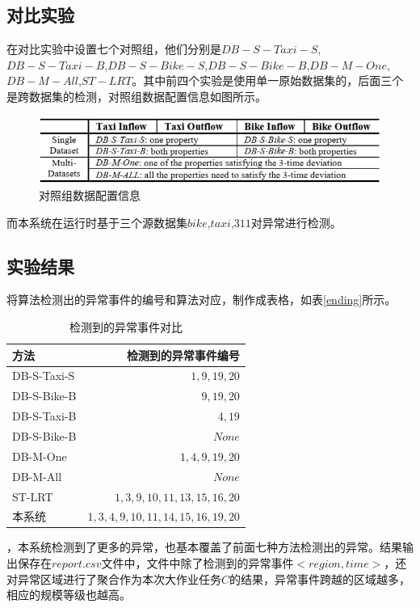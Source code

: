 \documentclass[a4paper, UTF8]{article}
\begin{document}
\begin{CJK}{UTF8}{gbsn}
\subsection{对比实验}
在对比实验中设置七个对照组，他们分别是$DB-S-Taxi-S$,$DB-S-Taxi-B$,$DB-S-Bike-S$,$DB-S-Bike-B$,$DB-M-One$,$DB-M-All$,$ST-LRT$。其中前四个实验是使用单一原始数据集的，后面三个是跨数据集的检测，对照组数据配置信息如图所示。
\begin{figure}[ht]
\includegraphics[scale = 0.6]{experiment.png}
\centering
\caption{对照组数据配置信息}
\end{figure}
\par 而本系统在运行时基于三个源数据集$bike$,$taxi$,$311$对异常进行检测。





\subsection{实验结果}
将算法检测出的异常事件的编号和算法对应，制作成表格，如表\ref{ending}所示。

\begin{table}[ht]
\centering
\caption{检测到的异常事件对比}
\label{ending}
\begin{tabular}{l|r}
\toprule 
\normalsize{\textbf{方法}} & \normalsize{\textbf{检测到的异常事件编号}}\\
\midrule
\normalsize{DB-S-Taxi-S} & \normalsize{$1,9,19,20$}\\
\normalsize{DB-S-Bike-B} & \normalsize{$9,19,20$}\\
\normalsize{DB-S-Taxi-B} & \normalsize{$4,19$}\\
\normalsize{DB-S-Bike-B} & \normalsize{$None$}\\
\normalsize{DB-M-One} & \normalsize{$1,4,9,19,20$}\\
\normalsize{DB-M-All} & \normalsize{$None$}\\
\normalsize{ST-LRT} & \normalsize{$1,3,9,10,11,13,15,16,20$}\\
\normalsize{本系统} & \normalsize{$1,3,4,9,10,11,14,15,16,19,20$}\\
\bottomrule
\end{tabular}
\label{table1}
\end{table}
，本系统检测到了更多的异常，也基本覆盖了前面七种方法检测出的异常。结果输出保存在$report.csv$文件中，文件中除了检测到的异常事件$<region,time>$，还对异常区域进行了聚合作为本次大作业任务$C$的结果，异常事件跨越的区域越多，相应的规模等级也越高。

\end{CJK}
\end{document}

